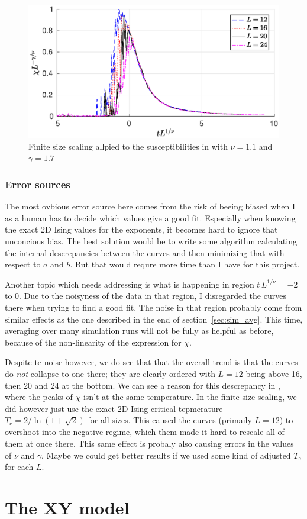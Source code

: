\documentclass[11pt,letter, swedish, english
]{article}
\newcommand{\Tc}{\ensuremath{T_{\text{c}}}}
\begin{document}
\begin{figure}
\centering
\includegraphics[width=.9\textwidth]{finite-scaling_L-16--24_Nsteps-2048_Nmean-16.eps}
\caption{Finite size scaling allpied to the susceptibilities in
   with $\nu=1.1$ and $\gamma=1.7$}
\label{fig:finite-scaling1}
\end{figure}

\subsubsection{Error sources}
The most ovbious error source here comes from the risk of beeing
biased when I as a human has to decide which values give a good
fit. Especially when knowing the exact 2D Ising values for the
exponents, it becomes hard to ignore that unconcious bias. The best
solution would be to write some algorithm calculating the internal
descrepancies between the curves and then minimizing that with respect
to $a$ and $b$. But that would requre more time than I have for this
project. 

Another topic which needs addressing is what is happening in region
$t\,L^{1/\nu}=-2$ to $0$. Due to the noisyness of the data in that
region, I disregarded the curves there when trying to find a good
fit. 
The noise in that region probably come from similar effects as the one 
described in the end of section~\ref{sec:sim_avg}. This time, averaging
over many simulation runs will not be fully as helpful as before,
because of the non-linearity of the expression for $\chi$.  

Despite te noise however, we do see that that the overall trend
is that the curves do \emph{not} collapse to one there; they are
clearly ordered with $L=12$ being above 16, then 20 and 24 at the
bottom. 
We can see a reason for this descrepancy in , where
the peaks of $\chi$ isn't at the same temperature. In the finite size
scaling, we did however just use the exact 2D Ising critical
tepmerature $\Tc=2/\ln(1+\sqrt2)$ for all sizes. This caused the
curves (primaily $L=12$) to overshoot into the negative regime, which
them made it hard to rescale all of them at once there. This same
effect is probaly also causing errors in the values of $\nu$ and
$\gamma$. Maybe we could get better results if we used some kind of
adjusted $\Tc$ for each $L$. 


\section{The XY model}
\end{document}
